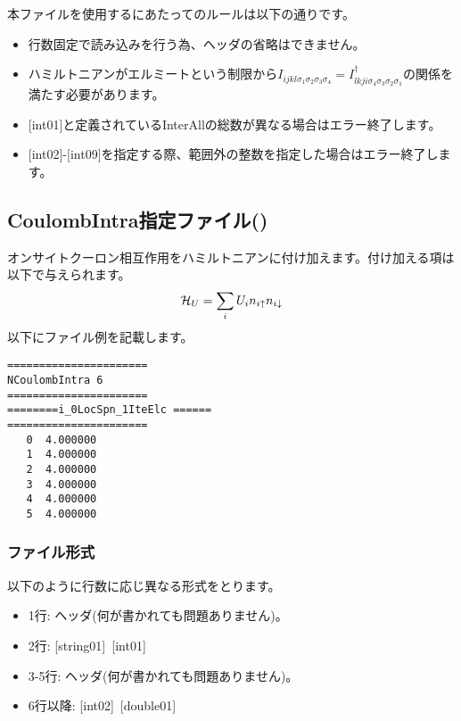 \subsubsection{}
本ファイルを使用するにあたってのルールは以下の通りです。
\begin{itemize}
\item 行数固定で読み込みを行う為、ヘッダの省略はできません。
\item ハミルトニアンがエルミートという制限から$I_{ijkl\sigma_1\sigma_2\sigma_3\sigma_4}=I_{lkji\sigma_4\sigma_3\sigma_2\sigma_1}^{\dag}$の関係を満たす必要があります。
\item $[$int01$]$と定義されているInterAllの総数が異なる場合はエラー終了します。
\item $[$int02$]$-$[$int09$]$を指定する際、範囲外の整数を指定した場合はエラー終了します。
\end{itemize}


\newpage
\subsection{CoulombIntra指定ファイル()}
\label{Subsec:coulombintra}
オンサイトクーロン相互作用をハミルトニアンに付け加えます。付け加える項は以下で与えられます。
\begin{equation}
{\cal H}_U =\sum_{i}U_i n_ {i \uparrow}n_{i \downarrow}
\end{equation}
以下にファイル例を記載します。

\begin{minipage}{12.5cm}
\begin{screen}
\begin{verbatim}
====================== 
NCoulombIntra 6  
====================== 
========i_0LocSpn_1IteElc ====== 
====================== 
   0  4.000000
   1  4.000000
   2  4.000000
   3  4.000000
   4  4.000000
   5  4.000000
\end{verbatim}
\end{screen}
\end{minipage}

\subsubsection{ファイル形式}
以下のように行数に応じ異なる形式をとります。
 \begin{itemize}
   \item  1行:  ヘッダ(何が書かれても問題ありません)。
   \item  2行:   [string01]~[int01]
   \item  3-5行:  ヘッダ(何が書かれても問題ありません)。
   \item  6行以降:
   [int02]~[double01] 
  \end{itemize}

